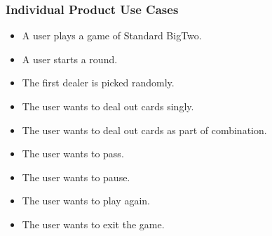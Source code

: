 \documentclass[12pt, titlepage]{article}
\begin{document}
\subsubsection{Individual Product Use Cases}
\begin{itemize}
    \item  A user plays a game of Standard BigTwo.
    \item A user starts a round.
    \item The first dealer is picked randomly.
    \item The user wants to deal out cards singly.
    \item The user wants to deal out cards as part of combination.
    \item The user wants to pass.
    \item The user wants to pause.
    \item The user wants to play again.
    \item The user wants to exit the game.
    
\end{itemize}
\FloatBarrier
\end{document}
